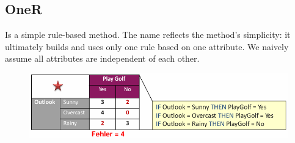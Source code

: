 \documentclass[../Main.tex]{subfiles}
\begin{document}
\subsection{OneR}
Is a simple rule-based method.
The name reflects the method's simplicity: it ultimately builds and uses only one rule based on one attribute.
We naively assume all attributes are independent of each other.
\begin{figure}[H]
    \centering
    \includegraphics[width=0.75\linewidth]{Images/datan/oner-example.png}
\end{figure}
\end{document}
